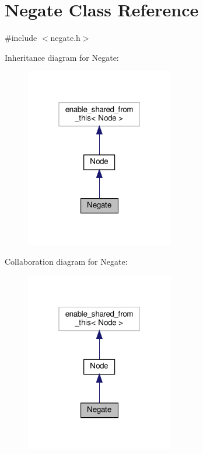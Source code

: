 \hypertarget{class_negate}{}\section{Negate Class Reference}
\label{class_negate}


{\ttfamily \#include $<$negate.\+h$>$}



Inheritance diagram for Negate\+:\nopagebreak
\begin{figure}[H]
\begin{center}
\leavevmode
\includegraphics[width=184pt]{d6/d79/class_negate__inherit__graph}
\end{center}
\end{figure}


Collaboration diagram for Negate\+:\nopagebreak
\begin{figure}[H]
\begin{center}
\leavevmode
\includegraphics[width=184pt]{da/d2b/class_negate__coll__graph}
\end{center}
\end{figure}
